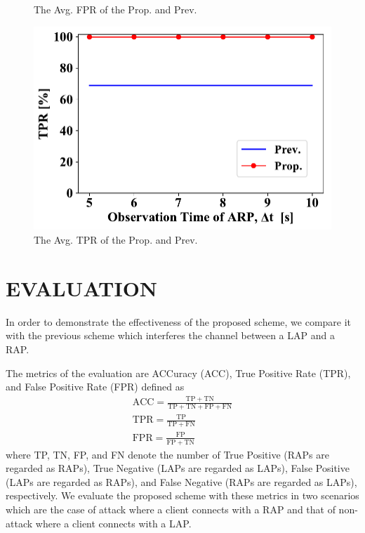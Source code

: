 \documentclass[conference]{IEEEtran}
\begin{document}
\begin{figure}[ht]
\begin{minipage}{0.33\hsize}
\begin{center}
        \end{center}
        \caption{The Avg. FPR of the Prop. and Prev.}
        \label{fig:fpr}
    \end{minipage}
    \begin{minipage}{0.33\hsize}
        \begin{center}
            \includegraphics[scale=0.35]{figure/TPR.pdf}
        \end{center}
        \caption{The Avg. TPR of the Prop. and Prev.}
        \label{fig:tpr}
    \end{minipage}
\vspace{-1zh}
\end{figure}
\section{EVALUATION}\label{sec:5}
In order to demonstrate the effectiveness of the proposed scheme, we compare it with the previous scheme \cite{previous} which interferes the channel between a LAP and a RAP.

The metrics of the evaluation are ACCuracy (ACC), True Positive Rate (TPR), and False Positive Rate (FPR) defined as
\begin{gather}
    \mathrm{ACC} = \frac{\mathrm{TP} + \mathrm{TN}}{\mathrm{TP} + \mathrm{TN} + \mathrm{FP} + \mathrm{FN}}\\
    \mathrm{TPR} = \frac{\mathrm{TP}}{\mathrm{TP} + \mathrm{FN}}\\
    \mathrm{FPR} = \frac{\mathrm{FP}}{\mathrm{FP} + \mathrm{TN}}
\end{gather}
where TP, TN, FP, and FN denote the number of True Positive (RAPs are regarded as RAPs), True Negative (LAPs are regarded as LAPs), False Positive (LAPs are regarded as RAPs), and False Negative (RAPs are regarded as LAPs), respectively.
We evaluate the proposed scheme with these metrics in two scenarios which are the case of attack where a client connects with a RAP and that of non-attack where a client connects with a LAP.
\end{document}
